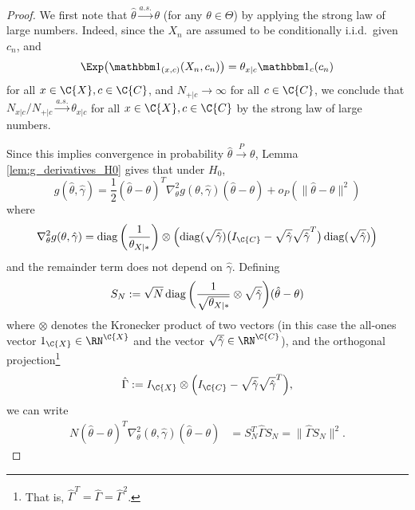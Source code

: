 \begin{proof}
  We first note that $\hat\theta \stackrel{a.s.}{\to} \theta$ (for any $\theta \in \Theta$) by applying the strong law of large numbers.
  Indeed, since the $X_n$ are assumed to be conditionally i.i.d.\ given $c_n$, and 
    $$\Exp \big(\I_{(x,c)}(X_n,c_n)\big) = \theta_{x|c} \I_c(c_n)$$
  for all $x \in \C{X}, c \in \C{C}$, and $N_{+|c} \to \infty$ for all
  $c \in \C{C}$, we conclude that $N_{x|c} / N_{+|c} \stackrel{a.s.}{\to} \theta_{x|c}$ 
  for all $x \in \C{X}, c \in \C{C}$
  by the strong law of large numbers.

  Since this implies convergence in probability $\hat\theta \stackrel{P}{\to} \theta$,
  Lemma \ref{lem:g_derivatives_H0} gives that under $H_0$,
  $$g(\hat\theta, \hat\gamma) = \frac{1}{2} (\hat\theta - \theta)^T \nabla_\theta^2 g(\theta,\hat\gamma) (\hat\theta - \theta) + o_P(\lVert\hat\theta - \theta\rVert^2)$$
  where
  $$\nabla^2_{\theta} g(\theta,\hat\gamma) = \diag\bigg(\frac{1}{\theta_{X|\ast}}\bigg) \otimes \left(\diag(\sqrt{\hat\gamma}) \big(I_{\C{C}} - \sqrt{\hat\gamma} \sqrt{\hat\gamma}^T\big)\diag(\sqrt{\hat\gamma})\right)$$
  and the remainder term does not depend on $\hat\gamma$.
  Defining
  $$S_N := \sqrt{N} \operatorname*{\mathrm{diag}}\bigg(\frac{1}{\sqrt{\theta_{X|\ast}}} \otimes \sqrt{\hat\gamma}\bigg) (\hat\theta - \theta)$$
  where $\otimes$ denotes the Kronecker product of two vectors (in this case the all-ones vector $1_{\C{X}} \in \RN^{\C{X}}$ and the vector $\sqrt{\hat\gamma} \in \RN^{\C{C}}$),
  and the orthogonal projection\footnote{That is, $\hat\Gamma^T = \hat\Gamma = \hat\Gamma^2$.}
  $$\hat\Gamma := I_{\C{X}} \otimes \Big(I_{\C{C}} - \sqrt{\hat\gamma} \sqrt{\hat\gamma}^T\Big),$$
  we can write
  \begin{equation*}\begin{split}
     N (\hat\theta - \theta)^T \nabla_\theta^2(\theta,\hat\gamma) (\hat\theta - \theta) 
    & = S_N^T \hat \Gamma S_N 
    = \lVert \hat\Gamma S_N \rVert^2.
  \end{split}\end{equation*}


\end{proof}
